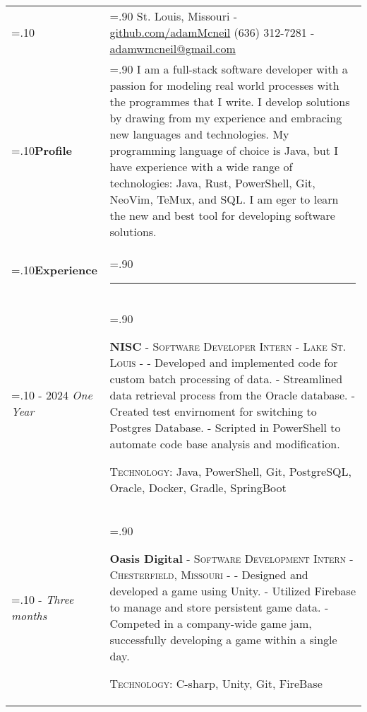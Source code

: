 \documentclass[10pt]{article}
\newcommand{\timeFrame}[3] {
  \if\relax\detokenize{#2}\relax
    #1
  \else
    #1 - #2
  \fi
  \newline
  \scriptsize \textit{#3}
}
\newcommand{\entry}[6] {
  \textbf{#1}
  \if\relax\detokenize{#2}\relax
  \else
       - \textsc{#2}
  \fi
  \if\relax\detokenize{#3}\relax
  \else
      - \textsc{#3}
  \fi
  \if\relax\detokenize{#4}\relax
  \else
      - \href{https://#4}{#4}
  \fi
  \newline #5
  \if\relax\detokenize{#6}\relax
  \else
      \newline \textsc{Technology:} #6
  \fi
  \\
}
\newcommand{\horizontalLine}[0] {
    \noindent\rule{.90\linewidth}{0.4pt}
}
\begin{document}

\begin{tabularx}{\linewidth}{>{\hsize=.10\hsize}X>{\hsize=.90\hsize}X}

{\bfseries\large Adam McNeil} &
St. Louis, Missouri - \href{https://github.com/adamMcneil}{github.com/adamMcneil}\newline
{(636) 312-7281 \hspace{5.5mm} - \href{mailto:adamwmcneil@gmail.com}{adamwmcneil@gmail.com}} \\[5pt]

\textbf{Profile} &
{I am a full-stack software developer with a passion for modeling real world processes with the programmes that I write.
 I develop solutions by drawing from my experience and embracing new languages and technologies.
 My programming language of choice is Java, but I have experience with a wide range of technologies: Java, Rust, PowerShell, Git, NeoVim, TeMux, and SQL.
 I am eger to learn the new and best tool for developing software solutions.
 \newline
} \\

\textbf{Experience} & \horizontalLine \\

\timeFrame{2023}{2024}{One Year} &
\entry{NISC}
  {Software Developer Intern}
  {Lake St. Louis}
  {}
  {
  - Developed and implemented code for custom batch processing of data. \newline
  - Streamlined data retrieval process from the Oracle database. \newline
  - Created test envirnoment for switching to Postgres Database. \newline
  - Scripted in PowerShell to automate code base analysis and modification.
  }
  {Java, PowerShell, Git, PostgreSQL, Oracle, Docker, Gradle, SpringBoot \newline}

\timeFrame{2022}{}{Three months} &
\entry{Oasis Digital}
  {Software Development Intern}
  {Chesterfield, Missouri}
  {}
  {
  - Designed and developed a game using Unity. \newline
  - Utilized Firebase to manage and store persistent game data. \newline
  - Competed in a company-wide game jam, successfully developing a game within a single day.
  }
  {C-sharp, Unity, Git, FireBase \newline}



\end{tabularx}
\end{document}
